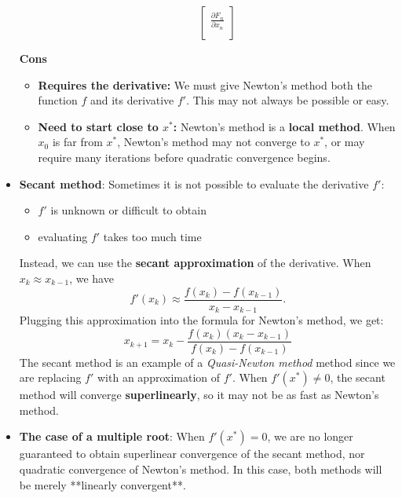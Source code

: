 \documentclass{report}
\begin{document}
\begin{itemize}
\begin{itemize}
$$\begin{bmatrix}
            \frac{\partial F_n}{\partial x_n}\\
        \end{bmatrix}$$
    \end{itemize}
    \bigbreak \noindent 
    \textbf{Cons}
    \begin{itemize}
        \item \textbf{Requires the derivative:} We must give Newton's method both the function $f$ and its derivative $f'$. This may not always be possible or easy.
        \item \textbf{Need to start close to $x^*$:} Newton's method is a \textbf{local method}. When $x_0$ is far from $x^*$, Newton's method may not converge to $x^*$, or may require many iterations before quadratic convergence begins.
    \end{itemize}
\item \textbf{Secant method}:
    Sometimes it is not possible to evaluate the derivative $f'$:
    \begin{itemize}
        \item $f'$ is unknown or difficult to obtain
        \item evaluating $f'$ takes too much time
    \end{itemize}
    Instead, we can use the \textbf{secant approximation} of the derivative. When $x_k \approx x_{k-1}$, we have
    $$ f'(x_k) \approx \frac{f(x_k) - f(x_{k-1})}{x_k - x_{k-1}}.$$
    Plugging this approximation into the formula for Newton's method, we get:
    $$x_{k+1} = x_k - \frac{f(x_k)(x_k - x_{k-1})}{f(x_k) - f(x_{k-1})}$$
    \bigbreak \noindent 
    The secant method is an example of a \textit{Quasi-Newton method} method since we are replacing $f'$ with an approximation of $f'$.
    \bigbreak \noindent 
    When $f'(x^*) \neq 0$, the secant method will converge \textbf{superlinearly}, so it may not be as fast as Newton's method.
\item \textbf{The case of a multiple root}:
    When $f'(x^*) = 0$, we are no longer guaranteed to obtain superlinear convergence of the secant method, nor quadratic convergence of Newton's method. In this case, both methods will be merely **linearly convergent**.


\end{itemize}
\end{document}
